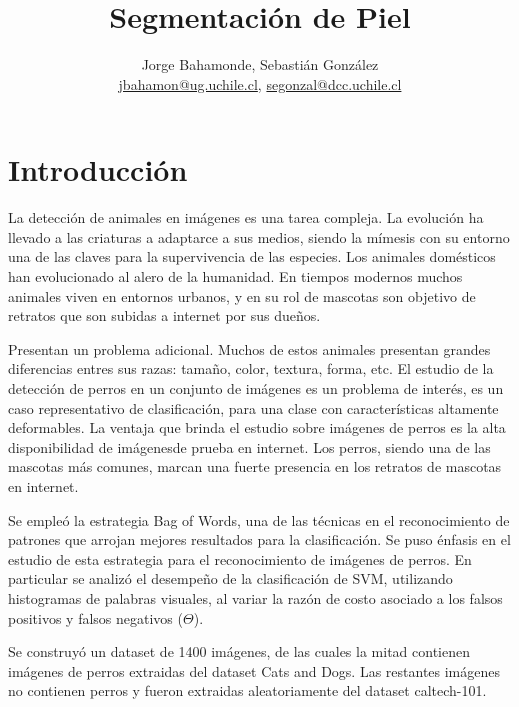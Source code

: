\documentclass[12pt]{article}
\title{Segmentación de Piel}
\author{Jorge Bahamonde, Sebastián González\\
\small{\url{jbahamon@ug.uchile.cl}, \url{segonzal@dcc.uchile.cl}}}
\date{}
\begin{document}
\maketitle

\section{Introducción}


La detección de animales en imágenes es una tarea compleja. La evolución ha llevado a
las criaturas a adaptarce a sus medios, siendo la mímesis con su entorno una de las claves para la supervivencia de las especies.
Los animales domésticos han evolucionado al alero de la humanidad. En tiempos modernos muchos animales viven en entornos urbanos,
y en su rol de mascotas son objetivo de retratos que son subidas a internet por sus dueños.

Presentan un problema adicional. Muchos de estos animales presentan grandes diferencias entres sus razas: tamaño, color, textura, forma, etc.
El estudio de la detección de perros en un conjunto de imágenes es un problema de interés, es un caso representativo de clasificación, para una clase con características
altamente deformables. La ventaja que brinda el estudio sobre imágenes de perros es la alta disponibilidad de imágenesde prueba en internet.
Los perros, siendo una de las mascotas más comunes, marcan una fuerte presencia en los retratos de mascotas en internet.

Se empleó la estrategia Bag of Words, una de las técnicas en el reconocimiento de patrones que arrojan mejores resultados para la clasificación.
Se puso énfasis en el estudio de esta estrategia para el reconocimiento de imágenes de perros. En particular se analizó el desempeño de la clasificación de SVM,
utilizando histogramas de palabras visuales, al variar la razón de costo asociado a los falsos positivos y falsos negativos ($\Theta$).

Se construyó un dataset de 1400 imágenes, de las cuales la mitad contienen imágenes de perros extraidas del dataset Cats and Dogs.
Las restantes imágenes no contienen perros y fueron extraidas aleatoriamente del dataset caltech-101.
\end{document}
